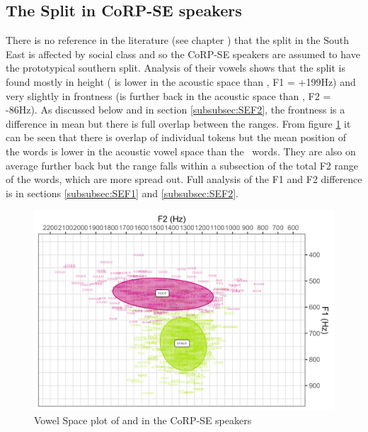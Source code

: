 \documentclass[../../../00.FullDoc/tex/ThesisSkeleton-draft2]{subfiles}
\begin{document}
\subsection{The  Split in CoRP-SE speakers}
There is no reference in the literature (see chapter \notinsubfile{\ref{ch:LitReviewSocio}}) that the split in the South East is affected by social class and so the CoRP-SE speakers are assumed to have the prototypical southern \FS{} split. Analysis of their vowels shows that the split is found mostly in height (\strutt{} is lower in the acoustic space than \foot{}, F1 = +199Hz) and very slightly in frontness (\strutt is further back in the acoustic space than \foot{}, F2 = -86Hz). As discussed below and in section \ref{subsubsec:SEF2}, the frontness is a difference in mean but there is full overlap between the ranges.
From figure \ref{fig:FSvplotSE} it can be seen that there is overlap of individual tokens but the mean position of the \strutt{} words is lower in the acoustic vowel space than the \foot\ words. They are also on average further back but the range falls within a subsection of the total F2 range of the  \foot{} words, which are more spread out.
Full analysis of the F1 and F2 difference is in sections \ref{subsubsec:SEF1} and \ref{subsubsec:SEF2}.


\begin{figure}[h]
	\centering
	\includegraphics[width=\textwidth]{../figures/FS-SE-vplot.png}
	\caption{Vowel Space plot of \foot{} and \strutt{} in the CoRP-SE speakers} \label{fig:FSvplotSE}
\end{figure}
\end{document}

